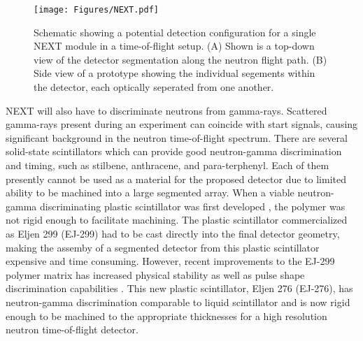 \documentclass[preprint,3p,twocolumn]{elsarticle}
\begin{document}
\begin{figure}[tp]
  \centering
  \texttt{[image: Figures/NEXT.pdf]}
  \caption{Schematic showing a potential detection configuration for a single NEXT module in a time-of-flight setup. (A) Shown is a top-down view of the detector segmentation along the neutron flight path. (B) Side view of a prototype showing the individual segements within the detector, each optically seperated from one another.}
  \label{fig:NEXTschematic}
\end{figure}
NEXT will also have to discriminate neutrons from gamma-rays. Scattered gamma-rays present during an experiment can coincide with start signals, causing significant background in the neutron time-of-flight spectrum.
There are several solid-state scintillators which can provide good neutron-gamma discrimination and timing, such as stilbene, anthracene, and para-terphenyl. Each of them presently cannot be used as a material for the proposed detector due to limited ability to be machined into a large segmented array. When a viable neutron-gamma discriminating plastic scintillator was first developed \cite{Zaitseva2012}, the polymer was not rigid enough to facilitate machining. The plastic scintillator commercialized as Eljen 299 (EJ-299) had to be cast directly into the final detector geometry, making the assemby of a segmented detector from this plastic scintillator expensive and time consuming. However, recent improvements to the EJ-299 polymer matrix has increased physical stability as well as pulse shape discrimination capabilities \cite{ZAITSEVA201897}. This new plastic scintillator, Eljen 276 (EJ-276), has neutron-gamma discrimination comparable to liquid scintillator and is now rigid enough to be machined to the appropriate thicknesses for a high resolution neutron time-of-flight detector.
\end{document}
